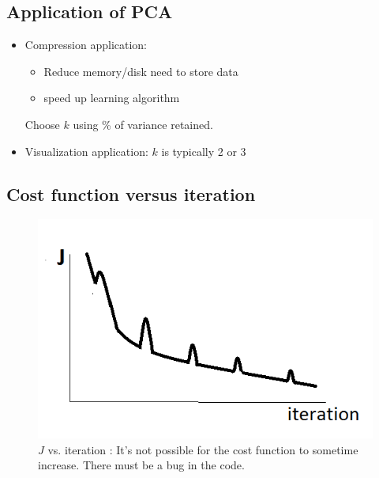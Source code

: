 \documentclass[a4paper,12pt]{report}
\begin{document}
\subsection{Application of PCA}
\begin{itemize}
\item Compression application:
\begin{itemize}
\item Reduce memory/disk need to store data
\item speed up learning algorithm
\end{itemize}
Choose $k$ using \% of variance retained.
\item Visualization application: 
$k$ is typically 2 or 3
\end{itemize}
\begin{appendices}

\section{Cost function versus iteration}

\begin{figure}[H]
	\centering
        \includegraphics[totalheight=6 cm]{fig3.png}\caption{$J$ vs. iteration : It's not possible for the cost function to sometime increase. There must be a bug in the code.}
\end{figure}

\end{appendices}
\end{document}
